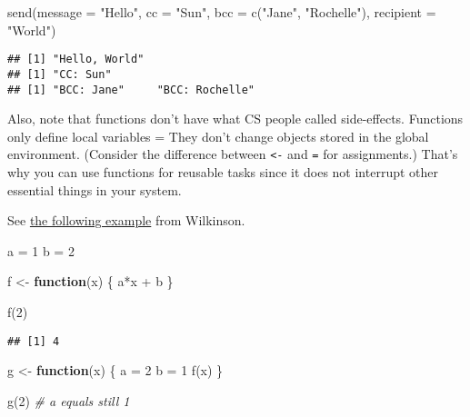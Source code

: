 \documentclass[
]{book}
\newenvironment{Shaded}{\begin{snugshade}}{\end{snugshade}}
\newcommand{\AttributeTok}[1]{\textcolor[rgb]{0.77,0.63,0.00}{#1}}
\newcommand{\CommentTok}[1]{\textcolor[rgb]{0.56,0.35,0.01}{\textit{#1}}}
\newcommand{\ControlFlowTok}[1]{\textcolor[rgb]{0.13,0.29,0.53}{\textbf{#1}}}
\newcommand{\DecValTok}[1]{\textcolor[rgb]{0.00,0.00,0.81}{#1}}
\newcommand{\FunctionTok}[1]{\textcolor[rgb]{0.00,0.00,0.00}{#1}}
\newcommand{\NormalTok}[1]{#1}
\newcommand{\OtherTok}[1]{\textcolor[rgb]{0.56,0.35,0.01}{#1}}
\newcommand{\SpecialCharTok}[1]{\textcolor[rgb]{0.00,0.00,0.00}{#1}}
\newcommand{\StringTok}[1]{\textcolor[rgb]{0.31,0.60,0.02}{#1}}
\begin{document}
\begin{Shaded}
\begin{Highlighting}[]
\FunctionTok{send}\NormalTok{(}\AttributeTok{message =} \StringTok{"Hello"}\NormalTok{, }\AttributeTok{cc =} \StringTok{"Sun"}\NormalTok{, }\AttributeTok{bcc =} \FunctionTok{c}\NormalTok{(}\StringTok{"Jane"}\NormalTok{, }\StringTok{"Rochelle"}\NormalTok{), }\AttributeTok{recipient =} \StringTok{"World"}\NormalTok{)}
\end{Highlighting}
\end{Shaded}

\begin{verbatim}
## [1] "Hello, World"
## [1] "CC: Sun"
## [1] "BCC: Jane"     "BCC: Rochelle"
\end{verbatim}

Also, note that functions don't have what CS people called side-effects. Functions only define local variables = They don't change objects stored in the global environment. (Consider the difference between \texttt{\textless{}-} and \texttt{=} for assignments.) That's why you can use functions for reusable tasks since it does not interrupt other essential things in your system.

See \href{https://darrenjw.wordpress.com/2011/11/23/lexical-scope-and-function-closures-in-r/}{the following example} from Wilkinson.

\begin{Shaded}
\begin{Highlighting}[]
\NormalTok{a }\OtherTok{=} \DecValTok{1} 
\NormalTok{b }\OtherTok{=} \DecValTok{2}

\NormalTok{f }\OtherTok{\textless{}{-}} \ControlFlowTok{function}\NormalTok{(x)}
\NormalTok{\{}
\NormalTok{  a}\SpecialCharTok{*}\NormalTok{x }\SpecialCharTok{+}\NormalTok{ b}
\NormalTok{\}}

\FunctionTok{f}\NormalTok{(}\DecValTok{2}\NormalTok{)}
\end{Highlighting}
\end{Shaded}

\begin{verbatim}
## [1] 4
\end{verbatim}

\begin{Shaded}
\begin{Highlighting}[]
\NormalTok{g }\OtherTok{\textless{}{-}} \ControlFlowTok{function}\NormalTok{(x)}
\NormalTok{\{}
\NormalTok{  a }\OtherTok{=} \DecValTok{2}
\NormalTok{  b }\OtherTok{=} \DecValTok{1}
  \FunctionTok{f}\NormalTok{(x)}
\NormalTok{\}}

\FunctionTok{g}\NormalTok{(}\DecValTok{2}\NormalTok{) }\CommentTok{\# a equals still 1 }
\end{Highlighting}
\end{Shaded}
\end{document}
